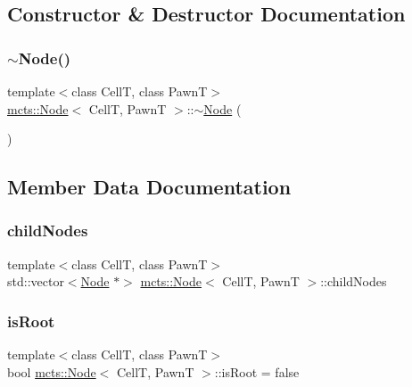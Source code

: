 \subsection{Constructor \& Destructor Documentation}
\mbox{\label{structmcts_1_1_node_a4507ae7e449448f5e67ac79782558070}} 
\subsubsection{\texorpdfstring{$\sim$\+Node()}{~Node()}}
{\footnotesize\ttfamily template$<$class CellT, class PawnT$>$ \\
\hyperlink{structmcts_1_1_node}{mcts\+::\+Node}$<$ CellT, PawnT $>$\+::$\sim$\hyperlink{structmcts_1_1_node}{Node} (\begin{DoxyParamCaption}{ }\end{DoxyParamCaption})\hspace{0.3cm}{\ttfamily [inline]}}



\subsection{Member Data Documentation}
\mbox{\label{structmcts_1_1_node_ae22ea6d47a865efe015fcc500bf4c217}} 
\subsubsection{\texorpdfstring{child\+Nodes}{childNodes}}
{\footnotesize\ttfamily template$<$class CellT, class PawnT$>$ \\
std\+::vector$<$\hyperlink{structmcts_1_1_node}{Node} $\ast$$>$ \hyperlink{structmcts_1_1_node}{mcts\+::\+Node}$<$ CellT, PawnT $>$\+::child\+Nodes}

\mbox{\label{structmcts_1_1_node_a0617583b89269c8df9bacf1f573c5657}} 
\subsubsection{\texorpdfstring{is\+Root}{isRoot}}
{\footnotesize\ttfamily template$<$class CellT, class PawnT$>$ \\
bool \hyperlink{structmcts_1_1_node}{mcts\+::\+Node}$<$ CellT, PawnT $>$\+::is\+Root = false}

